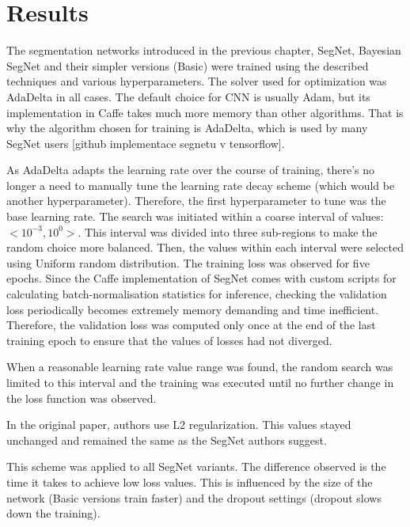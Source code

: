 \chapter{Results}

The segmentation networks introduced in the previous chapter, SegNet, Bayesian SegNet and their simpler versions (Basic) were trained using the described techniques and various hyperparameters. The solver used for optimization was AdaDelta in all cases.
The default choice for CNN is usually Adam, but its implementation in Caffe takes much more memory than other algorithms. That is why the algorithm chosen for training is AdaDelta, which is used by many SegNet users [github implementace segnetu v tensorflow].

As AdaDelta adapts the learning rate over the course of training, there's no longer a need to manually tune the learning rate decay scheme (which would be another hyperparameter). Therefore, the first hyperparameter to tune was the base learning rate. The search was initiated within a coarse interval of values: $ <10^{-3}, 10^{0}>  $. This interval was divided into three sub-regions to make the random choice more balanced. Then, the values within each interval were selected using Uniform random distribution. The training loss was observed for five epochs. Since the Caffe implementation of SegNet comes with custom scripts for calculating batch-normalisation statistics for inference, checking the validation loss periodically becomes extremely memory demanding and time inefficient. Therefore, the validation loss was computed only once at the end of the last training epoch to ensure that the values of losses had not diverged.  

When a reasonable learning rate value range was found, the random search was limited to this interval and the training was executed until no further change in the loss function was observed. 

In the original paper, authors use L2 regularization. This values stayed unchanged and remained the same as the SegNet authors suggest.  

This scheme was applied to all SegNet variants. The difference observed is the time it takes to achieve low loss values. This is influenced by the size of the network (Basic versions train faster) and the dropout settings (dropout slows down the training). 


